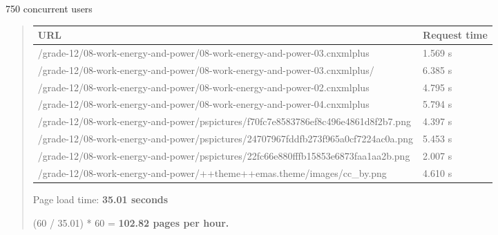 \documentclass[letterpaper,10pt,english]{sphinxmanual}
\begin{document}
750 concurrent users
\begin{quote}

\begin{tabulary}{\linewidth}{|L|L|}
\hline
\textbf{\relax 
URL
} & \textbf{\relax 
Request time
}\\\hline

/grade-12/08-work-energy-and-power/08-work-energy-and-power-03.cnxmlplus
 & 
1.569 s
\\\hline

/grade-12/08-work-energy-and-power/08-work-energy-and-power-03.cnxmlplus/
 & 
6.385 s
\\\hline

/grade-12/08-work-energy-and-power/08-work-energy-and-power-02.cnxmlplus
 & 
4.795 s
\\\hline

/grade-12/08-work-energy-and-power/08-work-energy-and-power-04.cnxmlplus
 & 
5.794 s
\\\hline

/grade-12/08-work-energy-and-power/pspictures/f70fc7e8583786ef8c496e4861d8f2b7.png
 & 
4.397 s
\\\hline

/grade-12/08-work-energy-and-power/pspictures/24707967fddfb273f965a0cf7224ac0a.png
 & 
5.453 s
\\\hline

/grade-12/08-work-energy-and-power/pspictures/22fc66e880fffb15853e6873faa1aa2b.png
 & 
2.007 s
\\\hline

/grade-12/08-work-energy-and-power/++theme++emas.theme/images/cc\_by.png
 & 
4.610 s
\\\hline
\end{tabulary}


Page load time: \textbf{35.01 seconds}

(60 / 35.01) * 60 = \textbf{102.82 pages per hour.}
\end{quote}
\end{document}
